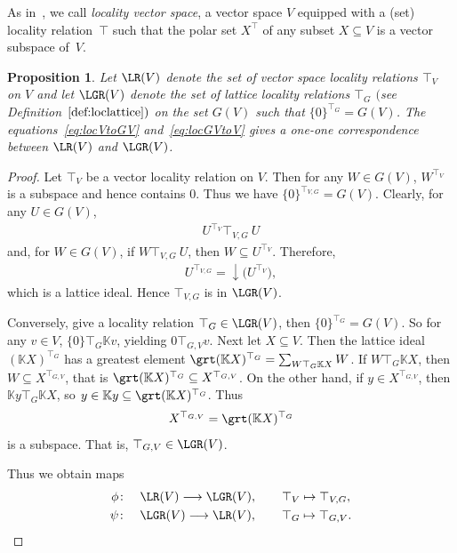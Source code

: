 \documentclass[10pt,a4paper]{amsart}
\numberwithin{equation}{section}
\newtheorem{Proposition}[Theorem]{Proposition}
\newcommand{\K}{\mathbb{K}}
\newcommand{\loc}{locality\xspace}
\begin{document}
As in~\cite{CGPZ1}, we call {\it locality vector space}, a vector space $V$ equipped with a (set) \loc rela\-tion~$\top$ such that the polar set $X^\top$ of any subset $X\subseteq V$ is a vector subspace of~$V$.

\begin{Proposition} \label{pp:lvtoll}
Let $\LR(V)$ denote the set of vector space locality relations $\top_V$ on $V$ and let $\LGR(V)$ denote the set of lattice locality relations $\top_G$ $($see Definition~$\ref{def:loclattice})$ on the set $G(V)$ such that
 $\{0\}^{\top _G}=G(V)$.
The equations~\eqref{eq:locVtoGV} and~\eqref{eq:locGVtoV} gives a one-one correspondence between $\LR(V)$ and $\LGR(V)$.
\end{Proposition}

\begin {proof}
Let $\top_V$ be a vector locality relation on $V$. Then for any $W\in G(V)$, $W^{\top_V}$ is a subspace and hence contains $0$. Thus we have $\{0\}^{\top_{V,G}}=G(V)$.
%
Clearly, for any $U\in G(V)$,
\begin{gather*}
U^{\top _V}\top _{V,G} \ U
\end{gather*}
and, for $W\in G(V)$, if $W\top _{V,G} \ U$, then $W\subseteq U^{\top _V}$. Therefore,
\begin{gather}\label{eq:relvr}
 U^{\top_{V,G}} = \downarrow \big(U^{\top_V}\big),
 \end{gather}
which is a lattice ideal. Hence $\top_{V,G}$ is in $\LGR(V)$.

Conversely, give a locality relation $\top_G\in \LGR(V)$, then $\{0\}^{\top _{G}}=G(V)$. So for any $v\in V$, $\{0\}\top _{G} \K v$, yielding $0\top_{G,V} v$.
%
Next let $X \subseteq V$. Then the lattice ideal $(\K X)^{\top_G}$ has a greatest element $\grt (\K X)^{\top_G}=\sum _{W\top _G \K X}W $. If $W\top _G \K X$, then $W\subseteq X^{\top_{G,V}}$, that is $\grt (\K X)^{\top_G} \subseteq X^{\top_{G,V}}$. On the other hand, if $y\in X^{\top_{G,V}}$, then $\K y \top _G \K X$, so $y\in\K y\subseteq \grt (\K X)^{\top_G}$. Thus
\begin{gather} \label{eq:relrv}
X^{\top_{G,V}}= \grt (\K X)^{\top_G}
\end{gather}
is a subspace. That is, ${\top_{G,V}}\in \LGR (V)$.

Thus we obtain maps
\begin{gather*}
\phi\colon\quad\LR(V)\longrightarrow \LGR(V),\qquad \top_V\mapsto \top_{V,G},
\\
\psi\colon\quad\LGR(V)\longrightarrow \LR(V),\qquad \top_G\mapsto \top_{G,V}.
\end{gather*}


\end{proof}
\end{document}
